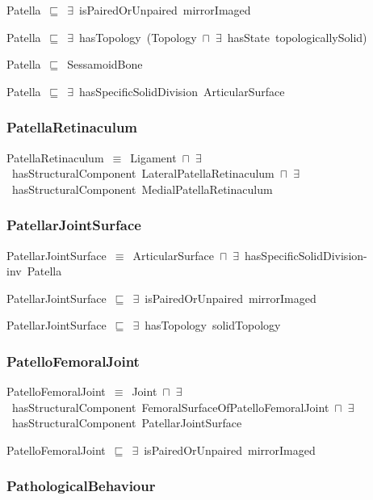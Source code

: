 \documentclass{article}
\begin{document}
Patella~\ensuremath{\sqsubseteq}~\ensuremath{\exists}~isPairedOrUnpaired~mirrorImaged~

Patella~\ensuremath{\sqsubseteq}~\ensuremath{\exists}~hasTopology~(Topology~\ensuremath{\sqcap}~\ensuremath{\exists}~hasState~topologicallySolid)~

Patella~\ensuremath{\sqsubseteq}~SessamoidBone~

Patella~\ensuremath{\sqsubseteq}~\ensuremath{\exists}~hasSpecificSolidDivision~ArticularSurface~

\subsubsection*{PatellaRetinaculum}

PatellaRetinaculum~\ensuremath{\equiv}~Ligament~\ensuremath{\sqcap}~\ensuremath{\exists}~hasStructuralComponent~LateralPatellaRetinaculum~\ensuremath{\sqcap}~\ensuremath{\exists}~hasStructuralComponent~MedialPatellaRetinaculum

\subsubsection*{PatellarJointSurface}

PatellarJointSurface~\ensuremath{\equiv}~ArticularSurface~\ensuremath{\sqcap}~\ensuremath{\exists}~hasSpecificSolidDivision-inv~Patella

PatellarJointSurface~\ensuremath{\sqsubseteq}~\ensuremath{\exists}~isPairedOrUnpaired~mirrorImaged~

PatellarJointSurface~\ensuremath{\sqsubseteq}~\ensuremath{\exists}~hasTopology~solidTopology~

\subsubsection*{PatelloFemoralJoint}

PatelloFemoralJoint~\ensuremath{\equiv}~Joint~\ensuremath{\sqcap}~\ensuremath{\exists}~hasStructuralComponent~FemoralSurfaceOfPatelloFemoralJoint~\ensuremath{\sqcap}~\ensuremath{\exists}~hasStructuralComponent~PatellarJointSurface

PatelloFemoralJoint~\ensuremath{\sqsubseteq}~\ensuremath{\exists}~isPairedOrUnpaired~mirrorImaged~

\subsubsection*{PathologicalBehaviour}
\end{document}

